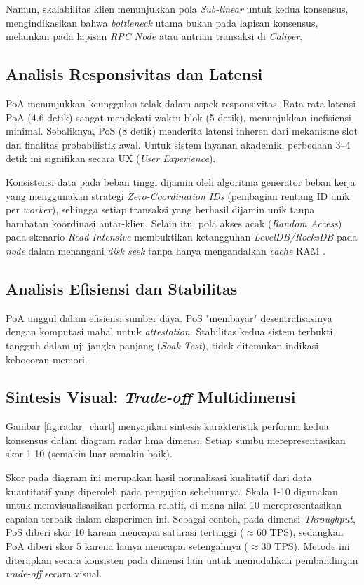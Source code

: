 Namun, skalabilitas klien menunjukkan pola \textit{Sub-linear} untuk kedua konsensus, mengindikasikan bahwa \textit{bottleneck} utama bukan pada lapisan konsensus, melainkan pada lapisan \textit{RPC Node} atau antrian transaksi di \textit{Caliper}.

\subsection{Analisis Responsivitas dan Latensi}

PoA menunjukkan keunggulan telak dalam aspek responsivitas. Rata-rata latensi PoA (4.6 detik) sangat mendekati waktu blok (5 detik), menunjukkan inefisiensi minimal. Sebaliknya, PoS (8 detik) menderita latensi inheren dari mekanisme slot dan finalitas probabilistik awal. Untuk sistem layanan akademik, perbedaan 3--4 detik ini signifikan secara UX (\textit{User Experience}).

Konsistensi data pada beban tinggi dijamin oleh algoritma generator beban kerja yang menggunakan strategi \textit{Zero-Coordination IDs} (pembagian rentang ID unik per \textit{worker}), sehingga setiap transaksi yang berhasil dijamin unik tanpa hambatan koordinasi antar-klien. Selain itu, pola akses acak (\textit{Random Access}) pada skenario \textit{Read-Intensive} membuktikan ketangguhan \textit{LevelDB/RocksDB} pada \textit{node} dalam menangani \textit{disk seek} tanpa hanya mengandalkan \textit{cache} RAM \cite{Repo-Benchmark-Pipeline}.

\subsection{Analisis Efisiensi dan Stabilitas}

PoA unggul dalam efisiensi sumber daya. PoS "membayar" desentralisasinya dengan komputasi mahal untuk \textit{attestation}. Stabilitas kedua sistem terbukti tangguh dalam uji jangka panjang (\textit{Soak Test}), tidak ditemukan indikasi kebocoran memori.

\subsection{Sintesis Visual: \textit{Trade-off} Multidimensi}

Gambar \ref{fig:radar_chart} menyajikan sintesis karakteristik performa kedua konsensus dalam diagram radar lima dimensi. Setiap sumbu merepresentasikan skor 1-10 (semakin luar semakin baik).

Skor pada diagram ini merupakan hasil normalisasi kualitatif dari data kuantitatif yang diperoleh pada pengujian sebelumnya. Skala 1-10 digunakan untuk memvisualisasikan performa relatif, di mana nilai 10 merepresentasikan capaian terbaik dalam eksperimen ini. Sebagai contoh, pada dimensi \textit{Throughput}, PoS diberi skor 10 karena mencapai saturasi tertinggi ($\approx$60 TPS), sedangkan PoA diberi skor 5 karena hanya mencapai setengahnya ($\approx$30 TPS). Metode ini diterapkan secara konsisten pada dimensi lain untuk memudahkan pembandingan \textit{trade-off} secara visual.

